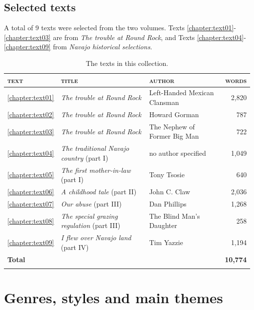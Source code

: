 \subsection{Selected texts}

A total of 9 texts were selected from the two volumes. Texts \ref{chapter:text01}-\ref{chapter:text03} are from \textit{The trouble at Round Rock}, and Texts \ref{chapter:text04}-\ref{chapter:text09} from \textit{Navajo historical selections}.

\begin{table}
    \caption{The texts in this collection.} \label{tab:texts}
\begin{tabularx}{\textwidth}{llQr}

    \lsptoprule
        \textsc{text} & \textsc{title} & \textsc{author}&\textsc{words}\\
    \midrule

		\ref{chapter:text01}&\textit{The trouble at Round Rock} & Left-Handed Mexican Clansman &2,820\\
        \ref{chapter:text02}&\textit{The trouble at Round Rock} & Howard Gorman &787\\
        \ref{chapter:text03}&\textit{The trouble at Round Rock} & The Nephew of Former Big Man&722\\
        \ref{chapter:text04}&\textit{The traditional Navajo country} (part I)&no author specified&1,049\\
        \ref{chapter:text05}&\textit{The first mother-in-law} (part I)&Tony Tsosie&640\\
        \ref{chapter:text06}&\textit{A childhood tale} (part II)&John C. Claw&2,036\\
        \ref{chapter:text07}&\textit{Our abuse} (part III)&Dan Phillips&1,268\\
        \ref{chapter:text08}&\textit{The special grazing regulation} (part III)&The Blind Man's Daughter&258\\
        \ref{chapter:text09}&\textit{I flew over Navajo land} (part IV)&Tim Yazzie&1,194\\
    \midrule    
        \textbf{Total}&&&\textbf{10,774}\\
    \lspbottomrule
    \end{tabularx}
\end{table}

\section{Genres, styles and main themes}


